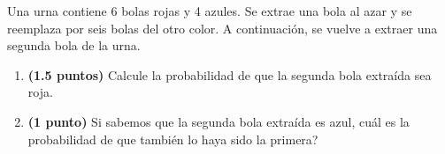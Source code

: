 
Una urna contiene 6 bolas rojas y 4 azules. Se extrae una bola al azar y se
reemplaza por seis bolas del otro color. A continuación, se vuelve a extraer
una segunda bola de la urna.
\begin{enumerate}[label=\alph*)]
  \item \textbf{(1.5 puntos)} Calcule la probabilidad de que la segunda bola
  extraída sea roja.
  \item \textbf{(1 punto)} Si sabemos que la segunda bola extraída es azul,
  \textquestiondown{}cuál es la probabilidad de que también lo haya sido la primera?
\end{enumerate}
